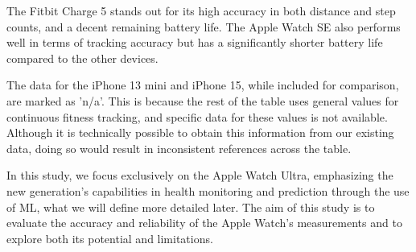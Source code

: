 The Fitbit Charge 5 stands out for its high accuracy in both distance and step counts, and a decent remaining battery life. The Apple Watch SE also performs well in terms of tracking accuracy but has a significantly shorter battery life compared to the other devices.

The data for the iPhone 13 mini and iPhone 15, while included for comparison, are marked as 'n/a'. This is because the rest of the table uses general values for continuous fitness tracking, and specific data for these values is not available. Although it is technically possible to obtain this information from our existing data, doing so would result in inconsistent references across the table.

In this study, we focus exclusively on the Apple Watch Ultra, emphasizing the new generation's capabilities in health monitoring and prediction through the use of ML, what we will define more detailed later. The aim of this study is to evaluate the accuracy and reliability of the Apple Watch's measurements and to explore both its potential and limitations.